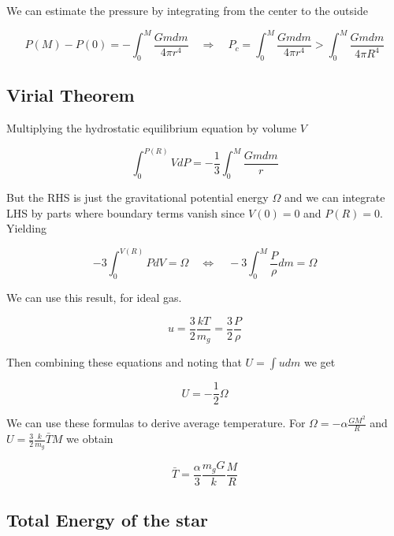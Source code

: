 We can estimate the pressure by integrating from the center to the outside

\begin{equation*}
    P(M) - P(0) = - \int_0^M \frac{G m dm}{4 \pi r^4} \quad \Rightarrow \quad P_c = \int_0^M \frac{G m dm}{4 \pi r^4} > \int_0^M \frac{G m dm}{4 \pi R^4}
\end{equation*}


\subsection{Virial Theorem}
Multiplying the hydrostatic equilibrium equation by volume $V$

\begin{equation*}
    \int_0^{P(R)} V dP = - \frac{1}{3} \int_0^M \frac{G m dm}{r}
\end{equation*}

But the RHS is just the gravitational potential energy $\Omega$ and we can integrate LHS by parts where boundary terms vanish since $V(0) = 0$ and $P(R) = 0$. Yielding

\begin{equation*}
    -3 \int_0^{V(R)} P dV = \Omega \quad \Leftrightarrow \quad -3 \int^M_0 \frac{P}{\rho} dm = \Omega
\end{equation*}

We can use this result, for ideal gas.

\begin{equation*}
    u = \frac{3}{2} \frac{k T}{m_g} = \frac{3}{2} \frac{P}{\rho}
\end{equation*}

Then combining these equations and noting that $U = \int u dm$ we get

\begin{equation*}
    U = -\frac{1}{2} \Omega
\end{equation*}

We can use these formulas to derive average temperature. For $\Omega = - \alpha \frac{GM^2}{R}$ and $U = \frac{3}{2} \frac{k}{m_g} \bar{T} M$ we obtain

\begin{equation*}
    \bar{T} = \frac{\alpha}{3} \frac{m_g G}{k} \frac{M}{R}
\end{equation*}


\subsection{Total Energy of the star}


